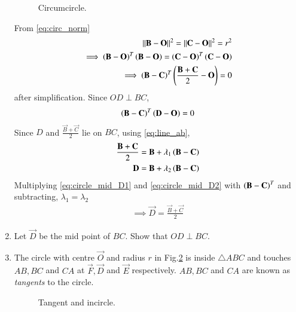 \begin{enumerate}[label=\arabic*.,ref=\thesubsection.\theenumi]
\begin{figure}[!ht]
\begin{center}
		\resizebox{\columnwidth}{!}{}
	\end{center}
	\caption{Circumcircle.}
	\label{fig:ccircle}	
\end{figure}


\solution From \eqref{eq:circ_norm}
\begin{align}
\left\lVert\mathbf{B}-\mathbf{O}\right\rVert^2=\left\lVert\mathbf{C}-\mathbf{O}\right\rVert^2=r^2
\\
 \implies \left(\mathbf{B}-\mathbf{O}\right)^T\left(\mathbf{B}-\mathbf{O}\right) = 
\left(\mathbf{C}-\mathbf{O}\right)^T\left(\mathbf{C}-\mathbf{O}\right) 
\\
 \implies \left(\mathbf{B}-\mathbf{C}\right)^T\left(\frac{\mathbf{B}+\mathbf{C}}{2} - 
\mathbf{O}\right)  = 0
\label{eq:circle_mid}
\end{align}
after simplification. Since $OD \perp BC$,
\begin{align}
\left(\mathbf{B}-\mathbf{C}\right)^T\left(\mathbf{D}-\mathbf{O}\right) = 0 
\label{eq:circle_D}
\end{align}
Since $D$ and $\frac{\vec{B}+\vec{C}}{2}$ lie on $BC$, using 
\eqref{eq:line_ab},
\begin{align}
\label{eq:circle_mid_D1}
\frac{\mathbf{B}+\mathbf{C}}{2}
&= \mathbf{B}+ \lambda_1\left(\mathbf{B}-\mathbf{C}\right)
\\
\mathbf{D}
&= \mathbf{B}+ \lambda_2\left(\mathbf{B}-\mathbf{C}\right)
\label{eq:circle_mid_D2}
\end{align}
Multiplying \eqref{eq:circle_mid_D1} and \eqref{eq:circle_mid_D2} with 
$\left(\mathbf{B}-\mathbf{C}\right)^T$ and subtracting, $\lambda_1=\lambda_2$
%
\begin{align}
\implies \vec{D} = \frac{\vec{B}+\vec{C}}{2}
\label{eq:circle_bisect}
\end{align}
%
\item Let  $\vec{D}$ be the mid point of $BC$.  Show that $OD \perp BC$.
%
\item The circle with centre $\vec{O}$ and radius $r$ in Fig.\ref{fig:ang_bisect}	
 is inside 
$\triangle ABC$ and touches $AB, BC$ 
and $CA$ at $\vec{F}, \vec{D}$ and $\vec{E}$ respectively. $AB, BC$ and 
$CA$ are known as {\em tangents} to the circle.
\begin{figure}[!ht]
	\begin{center}
		
		\resizebox{\columnwidth}{!}{}
	\end{center}
	\caption{Tangent and incircle.}
	\label{fig:ang_bisect}	
\end{figure}



\end{enumerate}
